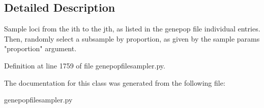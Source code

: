 \subsection{Detailed Description}
\begin{DoxyVerb}Sample loci from the ith to the jth, as listed in the 
genepop file individual entries.  Then, randomly select a subsample
by proportion, as given by the sample params "proportion" argument.
\end{DoxyVerb}
 

Definition at line 1759 of file genepopfilesampler.\+py.



The documentation for this class was generated from the following file\+:\begin{DoxyCompactItemize}
\item 
genepopfilesampler.\+py\end{DoxyCompactItemize}
